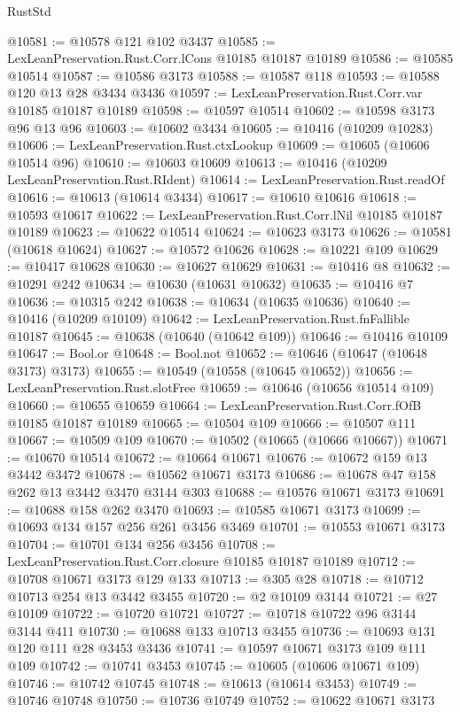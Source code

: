 \begin{lexlean}{RustStd}
\begin{coremodule}
@10581 := @10578 @121 @102 @3437
@10585 := LexLeanPreservation.Rust.Corr.lCons @10185 @10187 @10189
@10586 := @10585 @10514
@10587 := @10586 @3173
@10588 := @10587 @118
@10593 := @10588 @120 @13 @28 @3434 @3436
@10597 := LexLeanPreservation.Rust.Corr.var @10185 @10187 @10189
@10598 := @10597 @10514
@10602 := @10598 @3173 @96 @13 @96
@10603 := @10602 @3434
@10605 := @10416 (@10209 @10283)
@10606 := LexLeanPreservation.Rust.ctxLookup
@10609 := @10605 (@10606 @10514 @96)
@10610 := @10603 @10609
@10613 := @10416 (@10209 LexLeanPreservation.Rust.RIdent)
@10614 := LexLeanPreservation.Rust.readOf
@10616 := @10613 (@10614 @3434)
@10617 := @10610 @10616
@10618 := @10593 @10617
@10622 := LexLeanPreservation.Rust.Corr.lNil @10185 @10187 @10189
@10623 := @10622 @10514
@10624 := @10623 @3173
@10626 := @10581 (@10618 @10624)
@10627 := @10572 @10626
@10628 := @10221 @109
@10629 := @10417 @10628
@10630 := @10627 @10629
@10631 := @10416 @8
@10632 := @10291 @242
@10634 := @10630 (@10631 @10632)
@10635 := @10416 @7
@10636 := @10315 @242
@10638 := @10634 (@10635 @10636)
@10640 := @10416 (@10209 @10109)
@10642 := LexLeanPreservation.Rust.fnFallible @10187
@10645 := @10638 (@10640 (@10642 @109))
@10646 := @10416 @10109
@10647 := Bool.or
@10648 := Bool.not
@10652 := @10646 (@10647 (@10648 @3173) @3173)
@10655 := @10549 (@10558 (@10645 @10652))
@10656 := LexLeanPreservation.Rust.slotFree
@10659 := @10646 (@10656 @10514 @109)
@10660 := @10655 @10659
@10664 := LexLeanPreservation.Rust.Corr.fOfB @10185 @10187 @10189
@10665 := @10504 @109
@10666 := @10507 @111
@10667 := @10509 @109
@10670 := @10502 (@10665 (@10666 @10667))
@10671 := @10670 @10514
@10672 := @10664 @10671
@10676 := @10672 @159 @13 @3442 @3472
@10678 := @10562 @10671 @3173
@10686 := @10678 @47 @158 @262 @13 @3442 @3470 @3144 @303
@10688 := @10576 @10671 @3173
@10691 := @10688 @158 @262 @3470
@10693 := @10585 @10671 @3173
@10699 := @10693 @134 @157 @256 @261 @3456 @3469
@10701 := @10553 @10671 @3173
@10704 := @10701 @134 @256 @3456
@10708 := LexLeanPreservation.Rust.Corr.closure @10185 @10187 @10189
@10712 := @10708 @10671 @3173 @129 @133
@10713 := @305 @28
@10718 := @10712 @10713 @254 @13 @3442 @3455
@10720 := @2 @10109 @3144
@10721 := @27 @10109
@10722 := @10720 @10721
@10727 := @10718 @10722 @96 @3144 @3144 @411
@10730 := @10688 @133 @10713 @3455
@10736 := @10693 @131 @120 @111 @28 @3453 @3436
@10741 := @10597 @10671 @3173 @109 @111 @109
@10742 := @10741 @3453
@10745 := @10605 (@10606 @10671 @109)
@10746 := @10742 @10745
@10748 := @10613 (@10614 @3453)
@10749 := @10746 @10748
@10750 := @10736 @10749
@10752 := @10622 @10671 @3173

\end{coremodule}
\end{lexlean}
